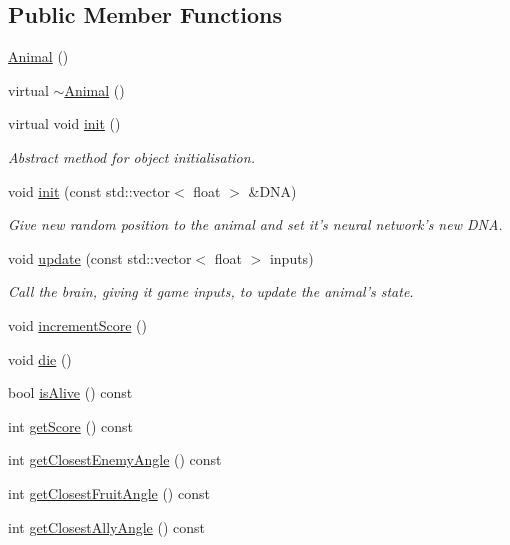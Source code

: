 \subsection*{Public Member Functions}
\begin{DoxyCompactItemize}
\item 
\hyperlink{class_animal_a1e726a49ec952443190ac62dad22353c}{Animal} ()
\item 
virtual \hyperlink{class_animal_a16d8b7f94611cc65f5cdb58cc105527b}{$\sim$\-Animal} ()
\item 
virtual void \hyperlink{class_animal_acd693bbac16d2f7dec930124887a9095}{init} ()
\begin{DoxyCompactList}\small\item\em Abstract method for object initialisation. \end{DoxyCompactList}\item 
void \hyperlink{class_animal_a75461b99c111f22dbb0231bcc397a1c9}{init} (const std\-::vector$<$ float $>$ \&D\-N\-A)
\begin{DoxyCompactList}\small\item\em Give new random position to the animal and set it's neural network's new D\-N\-A. \end{DoxyCompactList}\item 
void \hyperlink{class_animal_a18790d841ee27bf53ac8dfeb91750a80}{update} (const std\-::vector$<$ float $>$ inputs)
\begin{DoxyCompactList}\small\item\em Call the brain, giving it game inputs, to update the animal's state. \end{DoxyCompactList}\item 
void \hyperlink{class_animal_a31a4619f7b33b8b3ad6c0b1f43898cac}{increment\-Score} ()
\item 
void \hyperlink{class_animal_a557fe0d71dda75be2f8459ce0d7c2275}{die} ()
\item 
bool \hyperlink{class_animal_a5857d66a5303516578af7fc52ffc1107}{is\-Alive} () const 
\item 
int \hyperlink{class_animal_a9aedb2b6650341f976371a362d21ecfa}{get\-Score} () const 
\item 
int \hyperlink{class_animal_adabb251a3c5513ebbc62582a5a68055b}{get\-Closest\-Enemy\-Angle} () const 
\item 
int \hyperlink{class_animal_aac4b5d159b02fcae1dc6f427049c8485}{get\-Closest\-Fruit\-Angle} () const 
\item 
int \hyperlink{class_animal_a45483c0d3e22a02ca60aa83f4b1b0b23}{get\-Closest\-Ally\-Angle} () const 

\end{DoxyCompactItemize}
